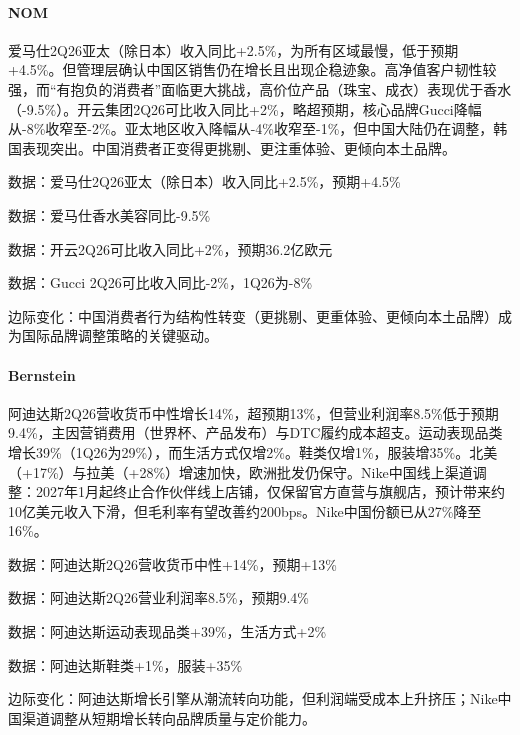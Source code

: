 \documentclass[11pt]{ctexart}
\begin{document}
\paragraph{NOM} 爱马仕2Q26亚太（除日本）收入同比+2.5\%，为所有区域最慢，低于预期+4.5\%。但管理层确认中国区销售仍在增长且出现企稳迹象。高净值客户韧性较强，而“有抱负的消费者”面临更大挑战，高价位产品（珠宝、成衣）表现优于香水（-9.5\%）。开云集团2Q26可比收入同比+2\%，略超预期，核心品牌Gucci降幅从-8\%收窄至-2\%。亚太地区收入降幅从-4\%收窄至-1\%，但中国大陆仍在调整，韩国表现突出。中国消费者正变得更挑剔、更注重体验、更倾向本土品牌。
{\small\color{refgray}数据：爱马仕2Q26亚太（除日本）收入同比+2.5\%，预期+4.5\%\par}
{\small\color{refgray}数据：爱马仕香水美容同比-9.5\%\par}
{\small\color{refgray}数据：开云2Q26可比收入同比+2\%，预期36.2亿欧元\par}
{\small\color{refgray}数据：Gucci 2Q26可比收入同比-2\%，1Q26为-8\%\par}
{\small\color{refgray}边际变化：中国消费者行为结构性转变（更挑剔、更重体验、更倾向本土品牌）成为国际品牌调整策略的关键驱动。\par}
\paragraph{Bernstein} 阿迪达斯2Q26营收货币中性增长14\%，超预期13\%，但营业利润率8.5\%低于预期9.4\%，主因营销费用（世界杯、产品发布）与DTC履约成本超支。运动表现品类增长39\%（1Q26为29\%），而生活方式仅增2\%。鞋类仅增1\%，服装增35\%。北美（+17\%）与拉美（+28\%）增速加快，欧洲批发仍保守。Nike中国线上渠道调整：2027年1月起终止合作伙伴线上店铺，仅保留官方直营与旗舰店，预计带来约10亿美元收入下滑，但毛利率有望改善约200bps。Nike中国份额已从27\%降至16\%。
{\small\color{refgray}数据：阿迪达斯2Q26营收货币中性+14\%，预期+13\%\par}
{\small\color{refgray}数据：阿迪达斯2Q26营业利润率8.5\%，预期9.4\%\par}
{\small\color{refgray}数据：阿迪达斯运动表现品类+39\%，生活方式+2\%\par}
{\small\color{refgray}数据：阿迪达斯鞋类+1\%，服装+35\%\par}
{\small\color{refgray}边际变化：阿迪达斯增长引擎从潮流转向功能，但利润端受成本上升挤压；Nike中国渠道调整从短期增长转向品牌质量与定价能力。\par}
\end{document}
